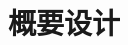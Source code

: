 \section{概要设计}


\begin{sidewaysfigure}
\centering
\newcommand{\defun}[2]{{\it #2}\\ {#1}}

\begin{tikzpicture}[align=center]


\end{tikzpicture}
\end{sidewaysfigure}
